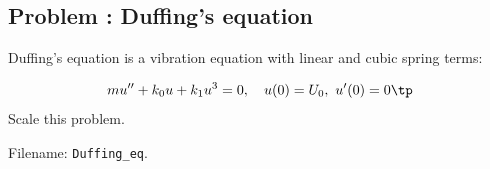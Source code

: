 \documentclass[graybox,envcountchap,sectrefs,final]{svmonodo}
\newenvironment{doconceexercise}{}{}
\newcounter{doconceexercisecounter}
\begin{document}
\begin{doconceexercise}

\subsection*{Problem \thedoconceexercisecounter: Duffing's equation}

\label{scale:vib:exer:Duffing}

Duffing's equation is a vibration equation with linear and cubic
spring terms:

\[ mu'' + k_0u + k_1u^3 = 0,\quad u(0)=U_0,\ u'(0)=0\tp\]
Scale this problem.


\noindent Filename: \Verb!Duffing_eq!.

\end{doconceexercise}
\end{document}
